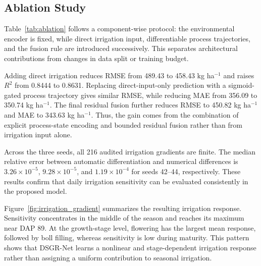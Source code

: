 \documentclass{article}
\begin{document}
\subsection{Ablation Study}
Table~\ref{tab:ablation} follows a component-wise protocol: the environmental encoder is fixed, while direct irrigation input, differentiable process trajectories, and the fusion rule are introduced successively. This separates architectural contributions from changes in data split or training budget.

\begin{table}[t]
\centering
\caption{Controlled ablation of irrigation input, process trajectory, and fusion.}
\label{tab:ablation}
\scriptsize
\setlength{\tabcolsep}{2.0pt}
\end{table}

Adding direct irrigation reduces RMSE from 489.43 to 458.43 kg ha$^{-1}$ and raises $R^2$ from 0.8444 to 0.8631. Replacing direct-input-only prediction with a sigmoid-gated process trajectory gives similar RMSE, while reducing MAE from 356.09 to 350.74 kg ha$^{-1}$. The final residual fusion further reduces RMSE to 450.82 kg ha$^{-1}$ and MAE to 343.63 kg ha$^{-1}$. Thus, the gain comes from the combination of explicit process-state encoding and bounded residual fusion rather than from irrigation input alone.

Across the three seeds, all 216 audited irrigation gradients are finite. The median relative error between automatic differentiation and numerical differences is $3.26\times10^{-5}$, $9.28\times10^{-5}$, and $1.19\times10^{-4}$ for seeds 42--44, respectively. These results confirm that daily irrigation sensitivity can be evaluated consistently in the proposed model.

Figure~\ref{fig:irrigation_gradient} summarizes the resulting irrigation response. Sensitivity concentrates in the middle of the season and reaches its maximum near DAP 89. At the growth-stage level, flowering has the largest mean response, followed by boll filling, whereas sensitivity is low during maturity. This pattern shows that DSGR-Net learns a nonlinear and stage-dependent irrigation response rather than assigning a uniform contribution to seasonal irrigation.
\end{document}
